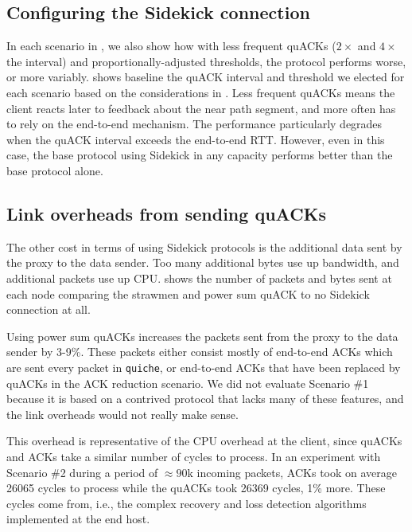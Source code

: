 \subsection{Configuring the Sidekick connection}



In each scenario in
, we also show how with less frequent quACKs
($2\times$ and $4\times$ the interval) and proportionally-adjusted thresholds,
the protocol performs worse, or more variably.
 shows baseline the quACK interval and
threshold we elected for each scenario based on the considerations in
.
Less frequent quACKs means the
client reacts later to feedback about the near path segment, and more often has
to rely on the end-to-end mechanism. The performance particularly degrades when
the quACK interval exceeds the end-to-end RTT. However, even in this case, the
base protocol using Sidekick in any capacity performs better than the base protocol
alone\@.

\subsection{Link overheads from sending quACKs}
\label{sec:sidekick:emulation:link-overheads}



The other cost in terms of using Sidekick protocols is the additional data sent
by the proxy to the data sender. Too many additional bytes use up bandwidth,
and additional packets use up CPU\@.  shows
the number of packets and bytes sent at each node comparing the strawmen and
power sum quACK to no Sidekick connection at all.

Using power sum quACKs increases the packets sent from the proxy to the data
sender
by 3-9\%. These packets either consist mostly
of end-to-end ACKs which are sent every packet in \texttt{quiche}, or end-to-end
ACKs that have been replaced by quACKs in the ACK reduction scenario.
We did not evaluate Scenario \#1 because it is based
on a contrived protocol that lacks many of these features, and the link
overheads would not really make sense.

This overhead is representative of the CPU overhead at the client, since
quACKs and ACKs take a similar number of cycles to process. In an experiment
with Scenario \#2 during a period of $\approx90$k incoming packets, ACKs took on
average 26065 cycles to process while the quACKs took 26369 cycles, 1\% more.
These cycles come from, i.e., the complex recovery and loss detection algorithms
implemented at the end host.

